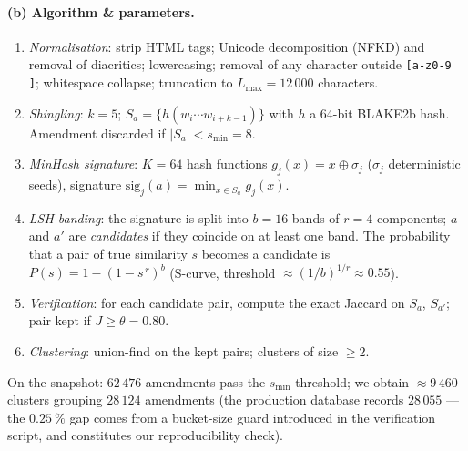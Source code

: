 \paragraph{(b) Algorithm \& parameters.}
\begin{enumerate}[label=\arabic*.]
  \item \emph{Normalisation}: strip HTML tags; Unicode decomposition (NFKD) and
        removal of diacritics; lowercasing; removal of any character outside
        \texttt{[a-z0-9 ]}; whitespace collapse; truncation to $L_{\max}=12\,000$
        characters.
  \item \emph{Shingling}: $k = 5$; $S_a=\{h(w_i\cdots w_{i+k-1})\}$ with $h$ a
        64-bit BLAKE2b hash. Amendment discarded if $|S_a| < s_{\min}=8$.
  \item \emph{MinHash signature}: $K=64$ hash functions $g_j(x)=x\oplus\sigma_j$
        ($\sigma_j$ deterministic seeds), signature $\mathrm{sig}_j(a)=\min_{x\in S_a} g_j(x)$.
  \item \emph{LSH banding}: the signature is split into $b=16$ bands of $r=4$
        components; $a$ and $a'$ are \emph{candidates} if they coincide on at
        least one band. The probability that a pair of true similarity $s$ becomes
        a candidate is $P(s)=1-(1-s^{\,r})^{b}$ (S-curve, threshold
        $\approx (1/b)^{1/r}\approx 0.55$).
  \item \emph{Verification}: for each candidate pair, compute the exact Jaccard on
        $S_a$, $S_{a'}$; pair kept if $J\ge\theta=0.80$.
  \item \emph{Clustering}: union-find on the kept pairs; clusters of size $\ge 2$.
\end{enumerate}
On the snapshot: $62\,476$ amendments pass the $s_{\min}$ threshold; we obtain
$\approx 9\,460$ clusters grouping $28\,124$ amendments (the production database
records $28\,055$ — the $0.25~\%$ gap comes from a bucket-size guard introduced in
the verification script, and constitutes our reproducibility check).

